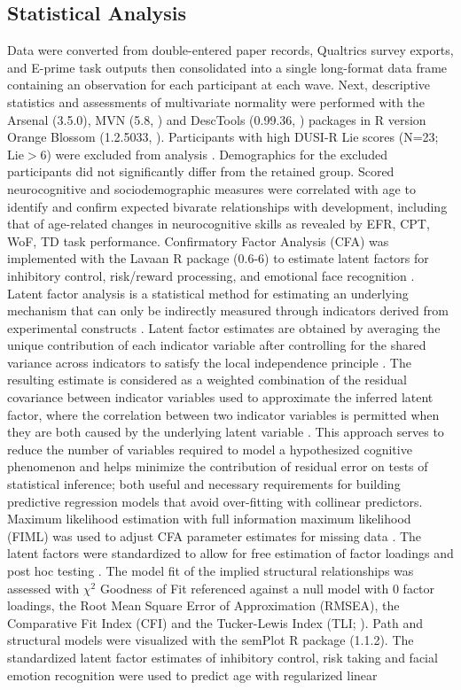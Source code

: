 \documentclass{article}%
\begin{document}
\subsection*{Statistical Analysis} Data were converted from double-entered paper records, Qualtrics survey exports, and E-prime task outputs then consolidated into a single long-format data frame containing an observation for each participant at each wave. Next, descriptive statistics and assessments of multivariate normality were performed with the Arsenal (3.5.0), MVN (5.8, \cite{MVN}) and DescTools (0.99.36, \cite{DescTools}) packages in R version Orange Blossom (1.2.5033, \cite{R}). Participants with high DUSI-R Lie scores (N=23; Lie$>6$) were excluded from analysis \citep{dalla2003effects}. Demographics for the excluded participants did not significantly differ from the retained group. Scored neurocognitive and sociodemographic measures were correlated with age to identify and confirm expected bivarate relationships with development, including that of age-related changes in neurocognitive skills as revealed by EFR, CPT, WoF, TD task performance. Confirmatory Factor Analysis (CFA) was implemented with the Lavaan R package (0.6-6) to estimate latent factors for inhibitory control, risk/reward processing, and emotional face recognition \citep{Lavaan}. Latent factor analysis is a statistical method for estimating an underlying mechanism that can only be indirectly measured through indicators derived from experimental constructs \citep{finch2015latent}. Latent factor estimates are obtained by averaging the unique contribution of each indicator variable after controlling for the shared variance across indicators to satisfy the local independence principle \citep{sobel1997measurement}. The resulting estimate is considered as a weighted combination of the residual covariance between indicator variables used to approximate the inferred latent factor, where the correlation between two indicator variables is permitted when they are both caused by the underlying latent variable \citep{cooper2019neuroimaging}. This approach serves to reduce the number of variables required to model a hypothesized cognitive phenomenon and helps minimize the contribution of residual error on tests of statistical inference; both useful and necessary requirements for building predictive regression models that avoid over-fitting with collinear predictors. Maximum likelihood estimation with full information maximum likelihood (FIML) was used to adjust CFA parameter estimates for missing data \citep{cham2017full}. The latent factors were standardized to allow for free estimation of factor loadings and post hoc testing \citep{HuTzeBentler1998}. The model fit of the implied structural relationships was assessed with $\chi^2$ Goodness of Fit referenced against a null model with $0$ factor loadings, the Root Mean Square Error of Approximation (RMSEA), the Comparative Fit Index (CFI) and the Tucker-Lewis Index (TLI; \cite{KennyEtAl2015,HuTzeBentler1999, wu2009evaluating}). Path and structural models were visualized with the semPlot R package (1.1.2). The standardized latent factor estimates of inhibitory control, risk taking and facial emotion recognition were used to predict age with regularized linear 
\end{document}
